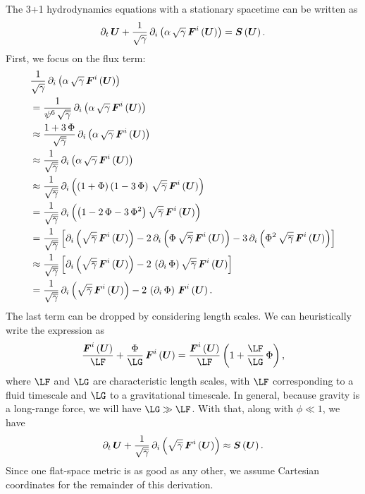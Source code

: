 The 3+1 hydrodynamics equations with a stationary spacetime can be written as
\citep{rz2013}
\begin{equation}
  \partial_{t}\,\boldsymbol{U}
  +\frac{1}{\sqrt{\gamma}}\,
  \partial_{i}\left(\alpha\,\sqrt{\gamma}\,\boldsymbol{F}^{i}\left(\boldsymbol{U}\right)\right)
  =\boldsymbol{S}\left(\boldsymbol{U}\right).
\end{equation}
First, we focus on the flux term:
\begin{align}
  &\frac{1}{\sqrt{\gamma}}\,
  \partial_{i}\left(\alpha\,\sqrt{\gamma}\,\boldsymbol{F}^{i}\left(\boldsymbol{U}\right)\right) \\
  &=\frac{1}{\psi^{6}\,\sqrt{\overline{\gamma}}}\,
  \partial_{i}\left(\alpha\,\sqrt{\gamma}\,\boldsymbol{F}^{i}\left(\boldsymbol{U}\right)\right) \\
  &\approx\frac{1+3\,\Phi}{\sqrt{\overline{\gamma}}}\,
  \partial_{i}\left(\alpha\,\sqrt{\gamma}\,\boldsymbol{F}^{i}\left(\boldsymbol{U}\right)\right) \\
  &\approx\frac{1}{\sqrt{\overline{\gamma}}}\,
  \partial_{i}\left(\alpha\,\sqrt{\gamma}\,\boldsymbol{F}^{i}\left(\boldsymbol{U}\right)\right) \\
  &\approx\frac{1}{\sqrt{\overline{\gamma}}}\,
  \partial_{i}\left(\left(1+\Phi\right)\left(1-3\,\Phi\right)\,\sqrt{\overline{\gamma}}\,
  \boldsymbol{F}^{i}\left(\boldsymbol{U}\right)\right) \\
  &=\frac{1}{\sqrt{\overline{\gamma}}}\,
  \partial_{i}\left(\left(1-2\,\Phi-3\,\Phi^{2}\right)\sqrt{\overline{\gamma}}\,
  \boldsymbol{F}^{i}\left(\boldsymbol{U}\right)\right) \\
  &=\frac{1}{\sqrt{\overline{\gamma}}}\left[
  \partial_{i}\left(\sqrt{\overline{\gamma}}\,
    \boldsymbol{F}^{i}\left(\boldsymbol{U}\right)\right)
  -2\,\partial_{i}\left(\Phi\,\sqrt{\overline{\gamma}}\,
    \boldsymbol{F}^{i}\left(\boldsymbol{U}\right)\right)
  -3\,\partial_{i}\left(\Phi^{2}\,\sqrt{\overline{\gamma}}\,
    \boldsymbol{F}^{i}\left(\boldsymbol{U}\right)\right)\right] \\
  &\approx\frac{1}{\sqrt{\overline{\gamma}}}\left[
  \partial_{i}\left(\sqrt{\overline{\gamma}}\,
    \boldsymbol{F}^{i}\left(\boldsymbol{U}\right)\right)
  -2\,\left(\partial_{i}\,\Phi\right)
  \sqrt{\overline{\gamma}}\,\boldsymbol{F}^{i}\left(\boldsymbol{U}\right)\right] \\
  &=\frac{1}{\sqrt{\overline{\gamma}}}\,
  \partial_{i}\left(\sqrt{\overline{\gamma}}\,
    \boldsymbol{F}^{i}\left(\boldsymbol{U}\right)\right)
  -2\,\left(\partial_{i}\,\Phi\right)\,
  \boldsymbol{F}^{i}\left(\boldsymbol{U}\right).
\end{align}
The last term can be dropped by considering length scales.
We can heuristically write the expression as
\begin{equation}
  \frac{\bs{F}^{i}\left(\bs{U}\right)}{\LF}
  +\frac{\Phi}{\LG}\,\bs{F}^{i}\left(\bs{U}\right)
  =\frac{\bs{F}^{i}\left(\bs{U}\right)}{\LF}
  \left(1+\frac{\LF}{\LG}\,\Phi\right),
\end{equation}
where $\LF$ and $\LG$ are characteristic length scales, with
$\LF$ corresponding to a fluid timescale and $\LG$ to
a gravitational timescale.
In general, because gravity is a long-range force, we will have
$\LG\gg\LF$.
With that, along with $\phi\ll1$, we have
\begin{equation}
  \partial_{t}\,\boldsymbol{U}
  +\frac{1}{\sqrt{\overline{\gamma}}}\,
  \partial_{i}\left(\sqrt{\overline{\gamma}}\,\boldsymbol{F}^{i}\left(\boldsymbol{U}\right)\right)
  \approx\boldsymbol{S}\left(\boldsymbol{U}\right).
\end{equation}
Since one flat-space metric is as good as any other,
we assume Cartesian coordinates for the remainder of this derivation.

